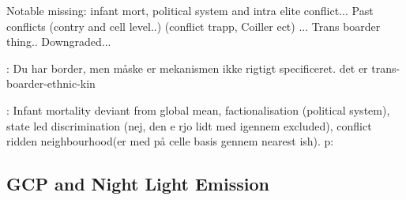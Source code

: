 \documentclass[a4paper]{article}
\begin{document}
Notable missing: infant mort, political system and intra elite conflict... \citep{Goldstone_2010} Past conflicts (contry and cell level..) (conflict trapp, Coiller ect) ... Trans boarder thing.. Downgraded... \citep{Cederman_Gleditsch_Buhaug_2013}

\cite[119-142]{Cederman_Gleditsch_Buhaug_2013}: Du har border, men måske er mekanismen ikke rigtigt specificeret. det er trans-boarder-ethnic-kin

\cite{Goldstone_2010} : Infant mortality deviant from global mean, factionalisation (political system), state led discrimination (nej, den e rjo lidt med igennem excluded), conflict ridden neighbourhood(er med på celle basis gennem nearest ish). p: 




\subsection{GCP and Night Light Emission}\label{GCP_corr}



\end{document}
